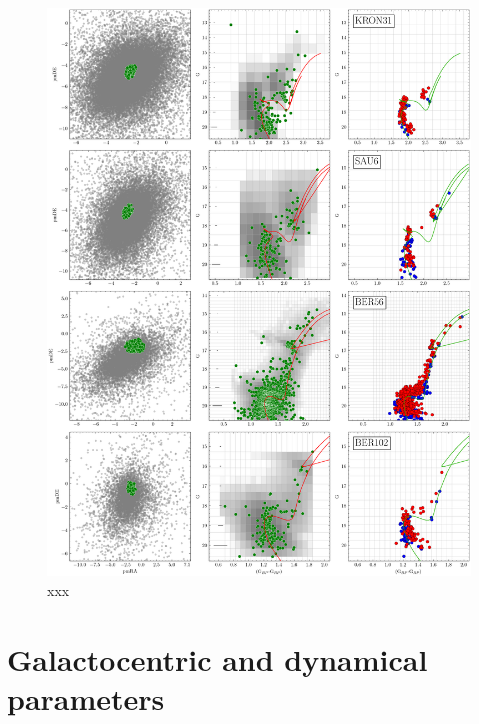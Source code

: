 \documentclass{aa}
\begin{document}
\begin{appendix}
 \begin{figure}
  \centering
  \includegraphics[height=.95\textheight]{figs/20_fpars.png}
  \caption{xxx}
  \label{fig:20fpars}
 \end{figure}



\section{Galactocentric and dynamical parameters}
\label{app:galac_dynam}


\end{appendix}
\end{document}
